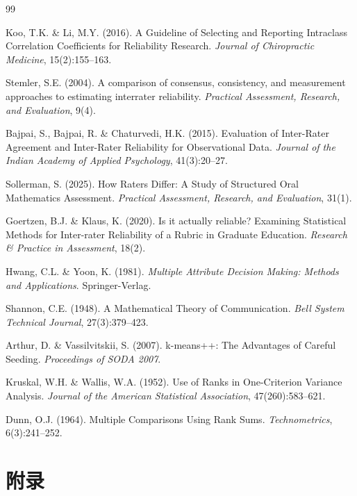 \documentclass[UTF8,12pt]{ctexart}
\begin{document}

\begin{thebibliography}{99}

Koo, T.K. \& Li, M.Y. (2016). A Guideline of Selecting and Reporting Intraclass Correlation Coefficients for Reliability Research. \textit{Journal of Chiropractic Medicine}, 15(2):155--163.

Stemler, S.E. (2004). A comparison of consensus, consistency, and measurement approaches to estimating interrater reliability. \textit{Practical Assessment, Research, and Evaluation}, 9(4).

Bajpai, S., Bajpai, R. \& Chaturvedi, H.K. (2015). Evaluation of Inter-Rater Agreement and Inter-Rater Reliability for Observational Data. \textit{Journal of the Indian Academy of Applied Psychology}, 41(3):20--27.

Sollerman, S. (2025). How Raters Differ: A Study of Structured Oral Mathematics Assessment. \textit{Practical Assessment, Research, and Evaluation}, 31(1).

Goertzen, B.J. \& Klaus, K. (2020). Is it actually reliable? Examining Statistical Methods for Inter-rater Reliability of a Rubric in Graduate Education. \textit{Research \& Practice in Assessment}, 18(2).

Hwang, C.L. \& Yoon, K. (1981). \textit{Multiple Attribute Decision Making: Methods and Applications}. Springer-Verlag.

Shannon, C.E. (1948). A Mathematical Theory of Communication. \textit{Bell System Technical Journal}, 27(3):379--423.

Arthur, D. \& Vassilvitskii, S. (2007). k-means++: The Advantages of Careful Seeding. \textit{Proceedings of SODA 2007}.

Kruskal, W.H. \& Wallis, W.A. (1952). Use of Ranks in One-Criterion Variance Analysis. \textit{Journal of the American Statistical Association}, 47(260):583--621.

Dunn, O.J. (1964). Multiple Comparisons Using Rank Sums. \textit{Technometrics}, 6(3):241--252.

\end{thebibliography}

\newpage
\appendix
\section{附录}
\end{document}
